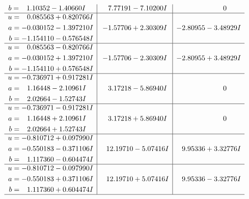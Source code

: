 \documentclass[1p]{elsarticle_modified}
\theoremstyle{definition}
\begin{document}
$$\begin{array}{c|c|c}
\begin{aligned}
b &= \phantom{-}1.10352 - 1.40660 I\end{aligned}
 & \phantom{-}7.77191 - 7.10200 I & \phantom{-0.000000 } 0 \\ \hline\begin{aligned}
u &= \phantom{-}0.085563 + 0.820766 I \\
a &= -0.030152 - 1.397210 I \\
b &= -1.154110 - 0.576548 I\end{aligned}
 & -1.57706 + 2.30309 I & -2.80955 - 3.48929 I \\ \hline\begin{aligned}
u &= \phantom{-}0.085563 - 0.820766 I \\
a &= -0.030152 + 1.397210 I \\
b &= -1.154110 + 0.576548 I\end{aligned}
 & -1.57706 - 2.30309 I & -2.80955 + 3.48929 I \\ \hline\begin{aligned}
u &= -0.736971 + 0.917281 I \\
a &= \phantom{-}1.16448 - 2.10961 I \\
b &= \phantom{-}2.02664 - 1.52743 I\end{aligned}
 & \phantom{-}3.17218 - 5.86940 I & \phantom{-0.000000 } 0 \\ \hline\begin{aligned}
u &= -0.736971 - 0.917281 I \\
a &= \phantom{-}1.16448 + 2.10961 I \\
b &= \phantom{-}2.02664 + 1.52743 I\end{aligned}
 & \phantom{-}3.17218 + 5.86940 I & \phantom{-0.000000 } 0 \\ \hline\begin{aligned}
u &= -0.810712 + 0.097990 I \\
a &= -0.550183 - 0.371106 I \\
b &= \phantom{-}1.117360 - 0.604474 I\end{aligned}
 & \phantom{-}12.19710 - 5.07416 I & \phantom{-}9.95336 + 3.32776 I \\ \hline\begin{aligned}
u &= -0.810712 - 0.097990 I \\
a &= -0.550183 + 0.371106 I \\
b &= \phantom{-}1.117360 + 0.604474 I\end{aligned}
 & \phantom{-}12.19710 + 5.07416 I & \phantom{-}9.95336 - 3.32776 I\\
 \hline 
 \end{array}$$\newpage$$\begin{array}{c|c|c}  

\end{array}$$
\end{document}
